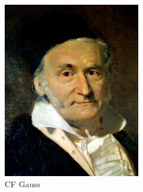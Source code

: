 \documentclass[
  a4paper,
  DIV=11,
  numbers=noendperiod,
  oneside]{scrreprt}
\theoremstyle{definition}
\theoremstyle{remark}
\begin{document}
\begin{figure}[H]

{\centering \includegraphics[width=6cm,height=\textheight,keepaspectratio]{Gauss.jpg}

}

\caption{CF Gauss}

\end{figure}%
\end{document}
